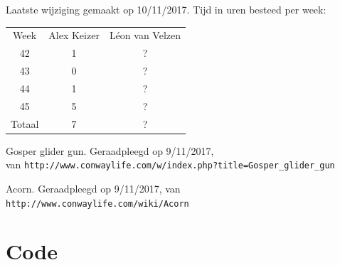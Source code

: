 \documentclass[10pt]{article}
\begin{document}
Laatste wijziging gemaakt op 10/11/2017. Tijd in uren besteed per week:

\begin{center}
\begin{tabular}{ |c|c|c| }
\hline
Week & Alex Keizer & L\'{e}on van Velzen \\
42 & 1 & ? \\
43 & 0 & ? \\
44 & 1 & ? \\
45 & 5 & ? \\ 
\hline
Totaal & 7 & ? \\
\hline
\end{tabular}
\end{center}

\begin{thebibliography}{9}
     Gosper glider gun. Geraadpleegd op 9/11/2017, \\
van \verb+http://www.conwaylife.com/w/index.php?title=Gosper_glider_gun+

	 Acorn. Geraadpleegd op 9/11/2017, 
van \verb+http://www.conwaylife.com/wiki/Acorn+
\end{thebibliography}

\section{Code}


\end{document}
